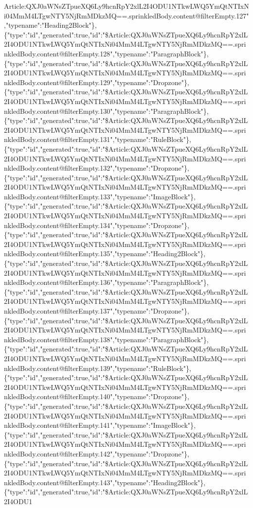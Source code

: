 Article:QXJ0aWNsZTpueXQ6Ly9hcnRpY2xlL2I4ODU1NTkwLWQ5YmQtNTIxNi04MmM4LTgwNTY5NjRmMDkzMQ==.sprinkledBody.content@filterEmpty.127","typename":"Heading2Block"\},\{"type":"id","generated":true,"id":"\$Article:QXJ0aWNsZTpueXQ6Ly9hcnRpY2xlL2I4ODU1NTkwLWQ5YmQtNTIxNi04MmM4LTgwNTY5NjRmMDkzMQ==.sprinkledBody.content@filterEmpty.128","typename":"ParagraphBlock"\},\{"type":"id","generated":true,"id":"\$Article:QXJ0aWNsZTpueXQ6Ly9hcnRpY2xlL2I4ODU1NTkwLWQ5YmQtNTIxNi04MmM4LTgwNTY5NjRmMDkzMQ==.sprinkledBody.content@filterEmpty.129","typename":"Dropzone"\},\{"type":"id","generated":true,"id":"\$Article:QXJ0aWNsZTpueXQ6Ly9hcnRpY2xlL2I4ODU1NTkwLWQ5YmQtNTIxNi04MmM4LTgwNTY5NjRmMDkzMQ==.sprinkledBody.content@filterEmpty.130","typename":"ParagraphBlock"\},\{"type":"id","generated":true,"id":"\$Article:QXJ0aWNsZTpueXQ6Ly9hcnRpY2xlL2I4ODU1NTkwLWQ5YmQtNTIxNi04MmM4LTgwNTY5NjRmMDkzMQ==.sprinkledBody.content@filterEmpty.131","typename":"RuleBlock"\},\{"type":"id","generated":true,"id":"\$Article:QXJ0aWNsZTpueXQ6Ly9hcnRpY2xlL2I4ODU1NTkwLWQ5YmQtNTIxNi04MmM4LTgwNTY5NjRmMDkzMQ==.sprinkledBody.content@filterEmpty.132","typename":"Dropzone"\},\{"type":"id","generated":true,"id":"\$Article:QXJ0aWNsZTpueXQ6Ly9hcnRpY2xlL2I4ODU1NTkwLWQ5YmQtNTIxNi04MmM4LTgwNTY5NjRmMDkzMQ==.sprinkledBody.content@filterEmpty.133","typename":"ImageBlock"\},\{"type":"id","generated":true,"id":"\$Article:QXJ0aWNsZTpueXQ6Ly9hcnRpY2xlL2I4ODU1NTkwLWQ5YmQtNTIxNi04MmM4LTgwNTY5NjRmMDkzMQ==.sprinkledBody.content@filterEmpty.134","typename":"Dropzone"\},\{"type":"id","generated":true,"id":"\$Article:QXJ0aWNsZTpueXQ6Ly9hcnRpY2xlL2I4ODU1NTkwLWQ5YmQtNTIxNi04MmM4LTgwNTY5NjRmMDkzMQ==.sprinkledBody.content@filterEmpty.135","typename":"Heading2Block"\},\{"type":"id","generated":true,"id":"\$Article:QXJ0aWNsZTpueXQ6Ly9hcnRpY2xlL2I4ODU1NTkwLWQ5YmQtNTIxNi04MmM4LTgwNTY5NjRmMDkzMQ==.sprinkledBody.content@filterEmpty.136","typename":"ParagraphBlock"\},\{"type":"id","generated":true,"id":"\$Article:QXJ0aWNsZTpueXQ6Ly9hcnRpY2xlL2I4ODU1NTkwLWQ5YmQtNTIxNi04MmM4LTgwNTY5NjRmMDkzMQ==.sprinkledBody.content@filterEmpty.137","typename":"Dropzone"\},\{"type":"id","generated":true,"id":"\$Article:QXJ0aWNsZTpueXQ6Ly9hcnRpY2xlL2I4ODU1NTkwLWQ5YmQtNTIxNi04MmM4LTgwNTY5NjRmMDkzMQ==.sprinkledBody.content@filterEmpty.138","typename":"ParagraphBlock"\},\{"type":"id","generated":true,"id":"\$Article:QXJ0aWNsZTpueXQ6Ly9hcnRpY2xlL2I4ODU1NTkwLWQ5YmQtNTIxNi04MmM4LTgwNTY5NjRmMDkzMQ==.sprinkledBody.content@filterEmpty.139","typename":"RuleBlock"\},\{"type":"id","generated":true,"id":"\$Article:QXJ0aWNsZTpueXQ6Ly9hcnRpY2xlL2I4ODU1NTkwLWQ5YmQtNTIxNi04MmM4LTgwNTY5NjRmMDkzMQ==.sprinkledBody.content@filterEmpty.140","typename":"Dropzone"\},\{"type":"id","generated":true,"id":"\$Article:QXJ0aWNsZTpueXQ6Ly9hcnRpY2xlL2I4ODU1NTkwLWQ5YmQtNTIxNi04MmM4LTgwNTY5NjRmMDkzMQ==.sprinkledBody.content@filterEmpty.141","typename":"ImageBlock"\},\{"type":"id","generated":true,"id":"\$Article:QXJ0aWNsZTpueXQ6Ly9hcnRpY2xlL2I4ODU1NTkwLWQ5YmQtNTIxNi04MmM4LTgwNTY5NjRmMDkzMQ==.sprinkledBody.content@filterEmpty.142","typename":"Dropzone"\},\{"type":"id","generated":true,"id":"\$Article:QXJ0aWNsZTpueXQ6Ly9hcnRpY2xlL2I4ODU1NTkwLWQ5YmQtNTIxNi04MmM4LTgwNTY5NjRmMDkzMQ==.sprinkledBody.content@filterEmpty.143","typename":"Heading2Block"\},\{"type":"id","generated":true,"id":"\$Article:QXJ0aWNsZTpueXQ6Ly9hcnRpY2xlL2I4ODU1